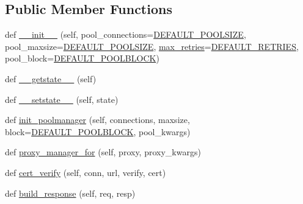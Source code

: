 \subsection*{Public Member Functions}
\begin{DoxyCompactItemize}
\item 
def \hyperlink{classpip_1_1__vendor_1_1requests_1_1adapters_1_1HTTPAdapter_a2ab7626cd27702e1018c9659d81478da}{\+\_\+\+\_\+init\+\_\+\+\_\+} (self, pool\+\_\+connections=\hyperlink{namespacepip_1_1__vendor_1_1requests_1_1adapters_af8e5fcb6cae7c37dd1f744e907414583}{D\+E\+F\+A\+U\+L\+T\+\_\+\+P\+O\+O\+L\+S\+I\+ZE}, pool\+\_\+maxsize=\hyperlink{namespacepip_1_1__vendor_1_1requests_1_1adapters_af8e5fcb6cae7c37dd1f744e907414583}{D\+E\+F\+A\+U\+L\+T\+\_\+\+P\+O\+O\+L\+S\+I\+ZE}, \hyperlink{classpip_1_1__vendor_1_1requests_1_1adapters_1_1HTTPAdapter_a1890f4528c843662658f580eb7f541cd}{max\+\_\+retries}=\hyperlink{namespacepip_1_1__vendor_1_1requests_1_1adapters_a1dc93197b7ccf57f9152a304c699a8e0}{D\+E\+F\+A\+U\+L\+T\+\_\+\+R\+E\+T\+R\+I\+ES}, pool\+\_\+block=\hyperlink{namespacepip_1_1__vendor_1_1requests_1_1adapters_a1a319251a1ddc3b53aa48239822097c1}{D\+E\+F\+A\+U\+L\+T\+\_\+\+P\+O\+O\+L\+B\+L\+O\+CK})
\item 
def \hyperlink{classpip_1_1__vendor_1_1requests_1_1adapters_1_1HTTPAdapter_a057fa65ea33c3fef74898e4cd54e715c}{\+\_\+\+\_\+getstate\+\_\+\+\_\+} (self)
\item 
def \hyperlink{classpip_1_1__vendor_1_1requests_1_1adapters_1_1HTTPAdapter_aeb613e3287fbf79d76278def16b17eb9}{\+\_\+\+\_\+setstate\+\_\+\+\_\+} (self, state)
\item 
def \hyperlink{classpip_1_1__vendor_1_1requests_1_1adapters_1_1HTTPAdapter_a40dcd38587377f194d9e1347e8b2e709}{init\+\_\+poolmanager} (self, connections, maxsize, block=\hyperlink{namespacepip_1_1__vendor_1_1requests_1_1adapters_a1a319251a1ddc3b53aa48239822097c1}{D\+E\+F\+A\+U\+L\+T\+\_\+\+P\+O\+O\+L\+B\+L\+O\+CK}, pool\+\_\+kwargs)
\item 
def \hyperlink{classpip_1_1__vendor_1_1requests_1_1adapters_1_1HTTPAdapter_a08a9fb0779c70ed124a151e7e21e4e64}{proxy\+\_\+manager\+\_\+for} (self, proxy, proxy\+\_\+kwargs)
\item 
def \hyperlink{classpip_1_1__vendor_1_1requests_1_1adapters_1_1HTTPAdapter_a52325d2ffdf6e613ebbbe516c989ff08}{cert\+\_\+verify} (self, conn, url, verify, cert)
\item 
def \hyperlink{classpip_1_1__vendor_1_1requests_1_1adapters_1_1HTTPAdapter_ae82a7e8c98f9f7e8317f903249a59444}{build\+\_\+response} (self, req, resp)

\end{DoxyCompactItemize}
